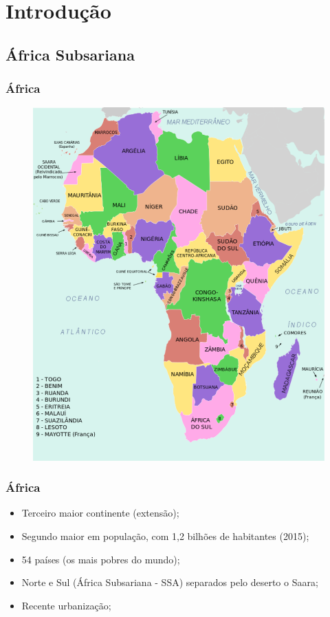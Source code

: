 \section{Introdução}

\subsection{África Subsariana}

\begin{frame}
  \frametitle{África}
  \begin{figure}[H]
  \centering
  \includegraphics[width=0.55\linewidth]{../../inputs/images/africa_wikipedia.pdf}
  \end{figure}
\end{frame}

\begin{frame}
  \frametitle{África}
   \begin{itemize}
     \item Terceiro maior continente (extensão);
     \item Segundo maior em população, com 1,2 bilhões de habitantes (2015);
     \item 54 países (os mais pobres do mundo);
     \item Norte e Sul (África Subsariana - SSA) separados pelo deserto o Saara;
     \item Recente urbanização;
   \end{itemize}
\end{frame}


